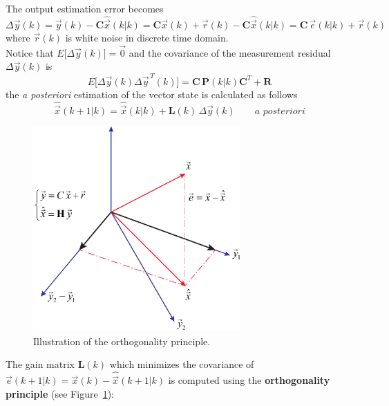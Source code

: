 \documentclass[11pt,a4paper,oneside]{book}
\numberwithin{equation}{section}
\theoremstyle{it}
\theoremstyle{definition}
\begin{document}
The output estimation error becomes
\begin{equation}\label{kalman_3}
	\Delta\vec{y}\left(k\right) = \vec{y}(k) - 
	\mathbf{C}\hat{\vec{x}}\left(k|k\right)= \mathbf{C}\vec{x}(k) + \vec{r}(k) 
	- \mathbf{C}\hat{\vec{x}}\left(k|k \right)= 
	\mathbf{C}\,\vec{e}(k|k)+\vec{r}(k)
\end{equation}
where $\vec{r}(k)$ is white noise in discrete time domain.\\
Notice that $E\Big[\Delta\vec{y}\left(k\right)\Big] = \vec{0}$ and the 
covariance of the measurement residual $\Delta\vec{y}\left(k\right)$ is
\begin{equation}\label{kalman_3b}
	E\Big[\Delta\vec{y}\left(k\right) \Delta\vec{y}^{\,T}\left(k\right)\Big] = 
	\mathbf{C}\,\mathbf{P}\left(k|k\right)\mathbf{C}^T+\mathbf{R} 
\end{equation}
the \textit{a posteriori} estimation of the vector state is calculated as 
follows
\begin{equation}\label{kalman_3c}
	\hat{\vec{x}}\left(k+1|k\right) = \hat{\vec{x}}\left(k|k\right) + 
	\mathbf{L}(k)\, \Delta\vec{y}\left(k\right) \qquad \textit{a posteriori}
\end{equation}
\begin{figure}[H]
	\centering
	\includegraphics[width = 225pt, angle=0, 
	keepaspectratio]{figures/kalman/kalman_orthogonality.eps}
	\captionsetup{width=0.75\textwidth}		
	\caption{Illustration of the orthogonality principle.}
	\label{fig_orth_pri}
\end{figure}
The gain matrix $\mathbf{L}(k)$ which minimizes the covariance of 
$\vec{e}(k+1|k)=\vec{x}(k)-\hat{\vec{x}}(k+1|k)$ is computed using the 
\textbf{orthogonality principle} (see Figure~\ref{fig_orth_pri}):
\end{document}
